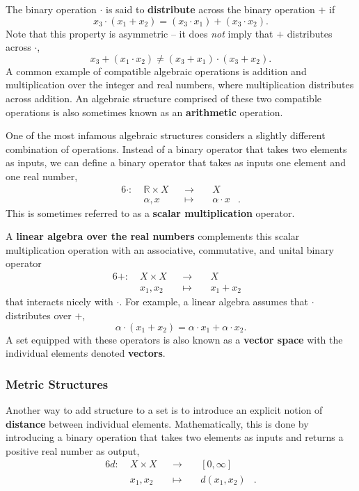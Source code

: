 \documentclass[
  letterpaper,
  DIV=11,
  numbers=noendperiod]{scrartcl}
\begin{document}
The binary operation \(\cdot\) is said to \textbf{distribute} across the
binary operation \(+\) if \[
x_3 \cdot (x_1 + x_2) = (x_3 \cdot x_1) + (x_3 \cdot x_2).
\] Note that this property is asymmetric -- it does \emph{not} imply
that \(+\) distributes across \(\cdot\), \[
x_3 + (x_1 \cdot x_2) \ne (x_3 + x_1) \cdot (x_3 + x_2).
\] A common example of compatible algebraic operations is addition and
multiplication over the integer and real numbers, where multiplication
distributes across addition. An algebraic structure comprised of these
two compatible operations is also sometimes known as an
\textbf{arithmetic} operation.

One of the most infamous algebraic structures considers a slightly
different combination of operations. Instead of a binary operator that
takes two elements as inputs, we can define a binary operator that takes
as inputs one element and one real number, \begin{alignat*}{6}
\cdot :\; & \mathbb{R} \times X& &\rightarrow& \; & X &
\\
& \alpha, x & &\mapsto& & \alpha \cdot x &.
\end{alignat*} This is sometimes referred to as a \textbf{scalar
multiplication} operator.

A \textbf{linear algebra over the real numbers} complements this scalar
multiplication operation with an associative, commutative, and unital
binary operator \begin{alignat*}{6}
+ :\; & X \times X& &\rightarrow& \; & X &
\\
& x_{1}, x_{2} & &\mapsto& & x_{1} + x_{2} &
\end{alignat*} that interacts nicely with \(\cdot\). For example, a
linear algebra assumes that \(\cdot\) distributes over \(+\), \[
\alpha \cdot (x_{1} + x_{2}) = \alpha \cdot x_{1} + \alpha \cdot x_{2}.
\] A set equipped with these operators is also known as a \textbf{vector
space} with the individual elements denoted \textbf{vectors}.

\subsubsection{Metric Structures}\label{metric-structures}

Another way to add structure to a set is to introduce an explicit notion
of \textbf{distance} between individual elements. Mathematically, this
is done by introducing a binary operation that takes two elements as
inputs and returns a positive real number as output, \begin{alignat*}{6}
d :\; & X \times X& &\rightarrow& \; & [0, \infty] &
\\
& x_{1}, x_{2} & &\mapsto& & d(x_{1}, x_{2}) &.
\end{alignat*}
\end{document}
